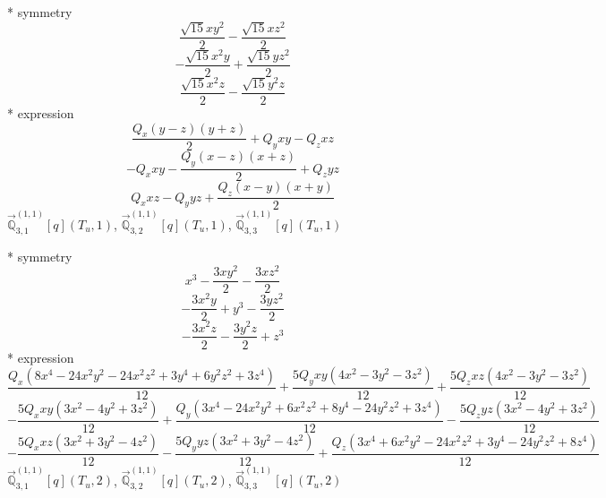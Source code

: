 \documentclass[fleqn,8pt]{jsarticle}
\begin{document}
\noindent\quad ** symmetry
\begin{dmath*}
\frac{\sqrt{15} x y^{2}}{2} - \frac{\sqrt{15} x z^{2}}{2}
\end{dmath*}
\begin{dmath*}
- \frac{\sqrt{15} x^{2} y}{2} + \frac{\sqrt{15} y z^{2}}{2}
\end{dmath*}
\begin{dmath*}
\frac{\sqrt{15} x^{2} z}{2} - \frac{\sqrt{15} y^{2} z}{2}
\end{dmath*}
\noindent\quad ** expression
\begin{dmath*}
\frac{Q_{x} \left(y - z\right) \left(y + z\right)}{2} + Q_{y} x y - Q_{z} x z
\end{dmath*}
\begin{dmath*}
- Q_{x} x y - \frac{Q_{y} \left(x - z\right) \left(x + z\right)}{2} + Q_{z} y z
\end{dmath*}
\begin{dmath*}
Q_{x} x z - Q_{y} y z + \frac{Q_{z} \left(x - y\right) \left(x + y\right)}{2}
\end{dmath*}
\noindent\quad $\vec{\mathbb{Q}}_{3,1}^{(1,1)}[q](T_{u},1)$, $\vec{\mathbb{Q}}_{3,2}^{(1,1)}[q](T_{u},1)$, $\vec{\mathbb{Q}}_{3,3}^{(1,1)}[q](T_{u},1)$

\noindent\quad ** symmetry
\begin{dmath*}
x^{3} - \frac{3 x y^{2}}{2} - \frac{3 x z^{2}}{2}
\end{dmath*}
\begin{dmath*}
- \frac{3 x^{2} y}{2} + y^{3} - \frac{3 y z^{2}}{2}
\end{dmath*}
\begin{dmath*}
- \frac{3 x^{2} z}{2} - \frac{3 y^{2} z}{2} + z^{3}
\end{dmath*}
\noindent\quad ** expression
\begin{dmath*}
\frac{Q_{x} \left(8 x^{4} - 24 x^{2} y^{2} - 24 x^{2} z^{2} + 3 y^{4} + 6 y^{2} z^{2} + 3 z^{4}\right)}{12} + \frac{5 Q_{y} x y \left(4 x^{2} - 3 y^{2} - 3 z^{2}\right)}{12} + \frac{5 Q_{z} x z \left(4 x^{2} - 3 y^{2} - 3 z^{2}\right)}{12}
\end{dmath*}
\begin{dmath*}
- \frac{5 Q_{x} x y \left(3 x^{2} - 4 y^{2} + 3 z^{2}\right)}{12} + \frac{Q_{y} \left(3 x^{4} - 24 x^{2} y^{2} + 6 x^{2} z^{2} + 8 y^{4} - 24 y^{2} z^{2} + 3 z^{4}\right)}{12} - \frac{5 Q_{z} y z \left(3 x^{2} - 4 y^{2} + 3 z^{2}\right)}{12}
\end{dmath*}
\begin{dmath*}
- \frac{5 Q_{x} x z \left(3 x^{2} + 3 y^{2} - 4 z^{2}\right)}{12} - \frac{5 Q_{y} y z \left(3 x^{2} + 3 y^{2} - 4 z^{2}\right)}{12} + \frac{Q_{z} \left(3 x^{4} + 6 x^{2} y^{2} - 24 x^{2} z^{2} + 3 y^{4} - 24 y^{2} z^{2} + 8 z^{4}\right)}{12}
\end{dmath*}
\noindent\quad $\vec{\mathbb{Q}}_{3,1}^{(1,1)}[q](T_{u},2)$, $\vec{\mathbb{Q}}_{3,2}^{(1,1)}[q](T_{u},2)$, $\vec{\mathbb{Q}}_{3,3}^{(1,1)}[q](T_{u},2)$
\end{document}
